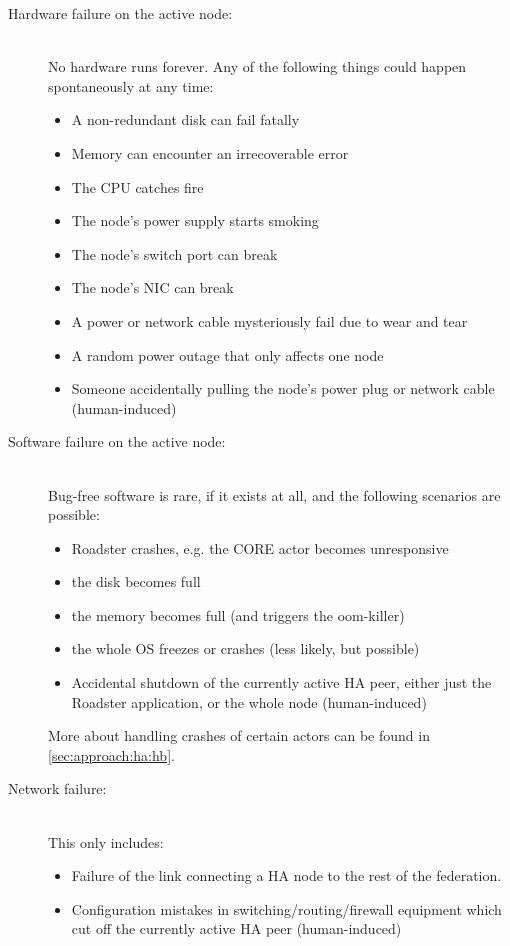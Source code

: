 \begin{description}
	\item [Hardware failure on the active node:] \hfill\\
		No hardware runs forever. Any of the following things could
		happen spontaneously at any time:

		\begin{itemize}
			\item A non-redundant disk can fail fatally
			\item Memory can encounter an irrecoverable error
			\item The \gls{CPU} catches fire
			\item The node's power supply starts smoking
			\item The node's switch port can break
			\item The node's \gls{NIC} can break
			\item A power or network cable mysteriously fail due to wear and tear
			\item A random power outage that only affects one node
			\item Someone accidentally pulling the node's power
				plug or network cable (human-induced)
		\end{itemize}

	\item [Software failure on the active node:] \hfill\\
		Bug-free software is rare, if it exists at all, and the
		following scenarios are possible:

		\begin{itemize}
			\item Roadster crashes, e.g. the CORE actor becomes unresponsive
			\item the disk becomes full
			\item the memory becomes full (and triggers the \gls{oom-killer})
			\item the whole OS freezes or crashes (less likely, but possible)
			\item Accidental shutdown of the currently active HA
				peer, either just the Roadster application, or
				the whole node (human-induced)
		\end{itemize}

		More about handling crashes of certain actors can be found in
		\autoref{sec:approach:ha:hb}.

	\item [Network failure:] \hfill\\
		This only includes:
		\begin{itemize}
			\item Failure of the link connecting a HA node to the
				rest of the federation.
			\item Configuration mistakes in
				switching/routing/firewall equipment which cut
				off the currently active HA peer (human-induced)
		\end{itemize}
\end{description}


